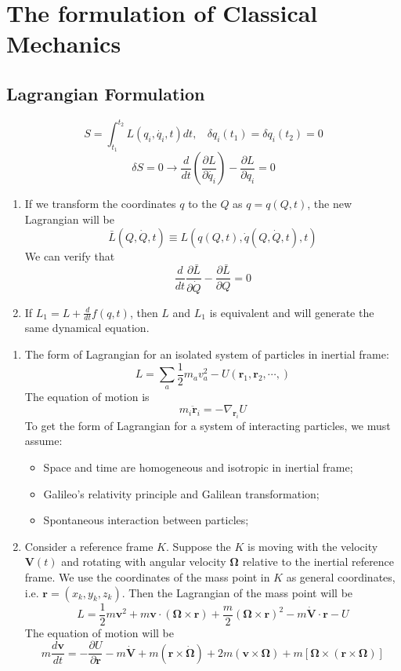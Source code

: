 \documentclass[cyan]{elegantnote}
\author{Yuyang Songsheng}
\begin{document}
\maketitle
\tableofcontents
\chapter{The formulation of Classical Mechanics}
\section{Lagrangian Formulation}
\[S=\int_{t_1}^{t_2}L(q_i,\dot{q_i},t)dt, \ \ \ \ \delta q_i(t_1) = \delta q_i(t_2) = 0\]
\[\delta S=0 \rightarrow \frac{d}{dt}(\frac{\partial L}{\partial \dot{q_i}}) - \frac{\partial L}{\partial q_i}=0\]

\begin{enumerate}
\item If we transform the coordinates $q$ to the $Q$ as $q = q(Q,t)$, the new Lagrangian will be
\[\bar{L}(Q,\dot{Q},t) \equiv L(q(Q,t),\dot{q}(Q,\dot{Q},t),t)\]
We can verify that
\[\frac{d}{dt}\frac{\partial \bar{L}}{\partial \dot{Q}} - \frac{\partial \bar{L}}{\partial Q} = 0\]
\item If $L_1 = L + \frac{d}{dt} f(q,t)$, then $L$ and $L_1$ is equivalent and will generate the same dynamical equation.
\end{enumerate}

\begin{example}
\begin{enumerate}
\item The form of Lagrangian for an isolated system of particles in inertial frame:
\[L=\sum_a \frac{1}{2}m_a v_a^2 -U(\bm{r}_1,\bm{r}_2,\cdots,)\]
The equation of motion is
\[m_i \ddot{\bm{r}}_i = -\nabla_{\bm{r}_i} U\]
To get the form of Lagrangian for a system of interacting particles, we must assume:
\begin{itemize}
\item Space and time are homogeneous and isotropic in inertial frame;
\item Galileo's relativity principle and Galilean transformation;
\item Spontaneous interaction between particles;
\end{itemize}
\item Consider a reference frame $K$. Suppose the $K$ is moving with the velocity $\bm{V}(t)$ and  rotating with angular velocity $\bm{\Omega}$  relative to the inertial reference frame. We use the coordinates of the mass point in $K$ as general coordinates, i.e. $\bm{r} = (x_k,y_k,z_k)$. Then the Lagrangian of the mass point will be
\[L = \frac{1}{2}m\bm{v}^2 + m\bm{v}\cdot(\bm{\Omega}\times\bm{r})+\frac{m}{2}(\bm{\Omega}\times\bm{r})^2 - m\dot{\bm{V}}\cdot\bm{r}-U\]
The equation of motion will be
\[m\frac{d\bm{v}}{dt} = -\frac{\partial U}{\partial \bm{r}} - m\dot{\bm{V}} + m(\bm{r} \times \dot{\bm{\Omega}}) + 2m(\bm{v} \times \bm{\Omega}) + m[\bm{\Omega}\times(\bm{r} \times \bm{\Omega})]\]
\end{enumerate}
\end{example}
\end{document}
